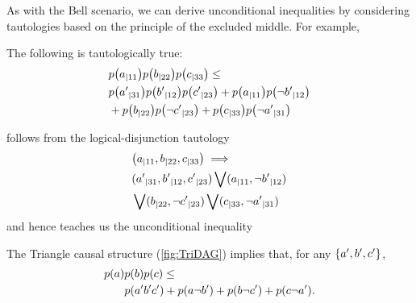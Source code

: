 As with the Bell scenario, we can derive unconditional inequalities by considering tautologies based on the principle of the excluded middle. For example,
\begin{taut}\label{taut:FritzF2}The following is tautologically true:
\begin{align*}
\begin{split}
&\p{a_{|11}}\p{b_{|22}}\p{c_{|33}}\leq\\& \p{{a'}_{|31}}\p{{b'}_{|12}}\p{{c'}_{|23}} + \p{a_{|11}}\p{{\nb'}_{|12}} \\&+ \p{b_{|22}}\p{{\nc'}_{|23}} + \p{c_{|33}}\p{{\na'}_{|31}}
\end{split}
\end{align*}
\end{taut}
follows from the logical-disjunction tautology 
\begin{align}\begin{split}
&\parens*{a_{|11},b_{|22},c_{|33}}\implies\\& \parens{{a'}_{|31},{b'}_{|12},{c'}_{|23}} \bigvee \parens{a_{|11},{\nb'}_{|12}} \\&\bigvee \parens{b_{|22},{\nc'}_{|23}} \bigvee \parens{c_{|33},{\na'}_{|31}}
\end{split}\end{align}
and hence teaches us the unconditional inequality
\begin{prop} \label{prop:FritzF2}
The Triangle causal structure (\cref{fig:TriDAG}) implies that, for any $\left\lbrace a',b',c'\right\rbrace$,
\begin{align*}\begin{split}
\p{a}&\p{b}\p{c}\leq\\& \p{a'b'c'} + \p{a\nb'} + \p{b\nc'} + \p{c\na'}.
\end{split}\end{align*}
\end{prop}


